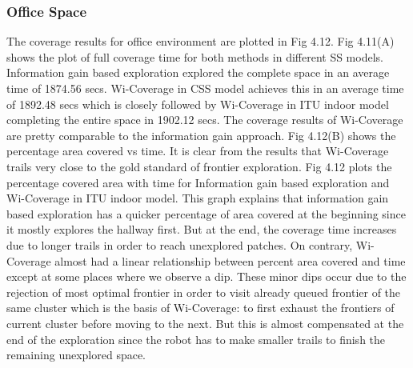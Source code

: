 \subsubsection{Office Space}
The coverage results for office environment are plotted in Fig 4.12. Fig 4.11(A) shows the plot of full coverage time for both methods in different SS models. Information gain based exploration explored the complete space in an average time of 1874.56 secs. Wi-Coverage in CSS model achieves this in an average time of 1892.48 secs which is closely followed by Wi-Coverage in ITU indoor model completing the entire space in 1902.12 secs. The coverage results of Wi-Coverage are pretty comparable to the information gain approach. Fig 4.12(B) shows the percentage area covered vs time. It is clear from the results that Wi-Coverage trails very close to the gold standard of frontier exploration. Fig 4.12 plots the percentage covered area with time for Information gain based exploration and Wi-Coverage in ITU indoor model. This graph explains that information gain based exploration has a quicker percentage of area covered at the beginning since it mostly explores the hallway first. But at the end, the coverage time increases due to longer trails in order to reach unexplored patches. On contrary, Wi-Coverage  almost had a linear relationship between percent area covered and time except at some places where we observe a dip. These minor dips occur due to the rejection of most optimal frontier in order to visit already queued frontier of the same cluster which is the basis of Wi-Coverage: to first exhaust the frontiers of current cluster before moving to the next. But this is almost compensated at the end of the exploration since the robot has to make smaller trails to finish the remaining unexplored space.  

